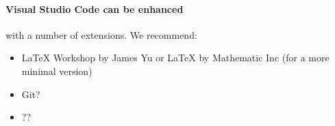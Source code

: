 \documentclass{ximera}
\begin{document}
\paragraph{Visual Studio Code can be enhanced} with a number of extensions. We recommend:
\begin{itemize}
      \item LaTeX Workshop by James Yu or LaTeX by Mathematic Inc (for a more minimal version)
      \item Git?
      \item ??
\end{itemize}




\end{document}
